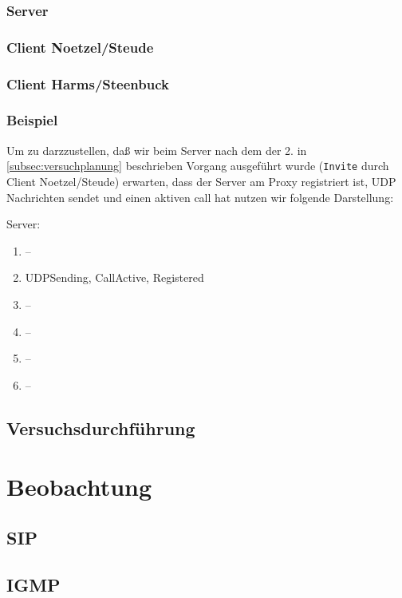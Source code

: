 \documentclass[10pt]{scrartcl}
\begin{document}
\subsubsection{Server}

\subsubsection{Client Noetzel/Steude}

\subsubsection{Client Harms/Steenbuck}
	

\subsubsection{Beispiel}
Um zu darzzustellen, daß wir beim Server nach dem der 2. in \ref{subsec:versuchplanung} beschrieben Vorgang ausgeführt wurde (\verb!Invite! durch Client Noetzel/Steude) erwarten, dass der Server am Proxy registriert ist, UDP Nachrichten sendet und einen aktiven call hat nutzen wir folgende Darstellung:

Server:
\begin{enumerate}
	\item --
	\item UDPSending, CallActive, Registered
	\item --
	\item --
	\item --
	\item --
\end{enumerate}

\subsection{Versuchsdurchführung}

	
	
\section{Beobachtung} \label{sec:beobachtung}

\subsection{SIP}

\subsection{IGMP}
\end{document}

